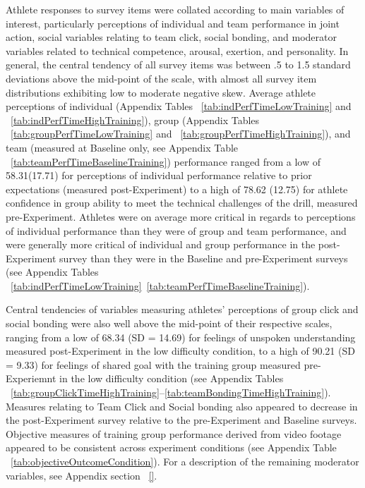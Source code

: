 \documentclass[english]{article}\usepackage[]{graphicx}\usepackage[]{color}
\begin{document}
Athlete responses to survey items were collated according to main variables of interest, particularly perceptions of individual and team performance in joint action, social variables relating to team click, social bonding, and moderator variables related to technical competence, arousal, exertion, and personality. In general, the central tendency of all survey items was between .5 to 1.5 standard deviations above the mid-point of the scale, with almost all survey item distributions exhibiting low to moderate negative skew.  Average athlete perceptions of individual (Appendix Tables ~\ref{tab:indPerfTimeLowTraining} and ~\ref{tab:indPerfTimeHighTraining}), group (Appendix Tables ~\ref{tab:groupPerfTimeLowTraining} and ~\ref{tab:groupPerfTimeHighTraining}), and team (measured at Baseline only, see Appendix Table ~\ref{tab:teamPerfTimeBaselineTraining}) performance ranged from a low of 58.31(17.71) for perceptions of individual performance relative to prior expectations (measured post-Experiment) to a high of 78.62 (12.75) for athlete confidence in group ability to meet the technical challenges of the drill, measured pre-Experiment.  Athletes were on average more critical in regards to perceptions of individual performance than they were of group and team performance, and were generally more critical of individual and group performance in the post-Experiment survey than they were in the Baseline and pre-Experiment surveys (see Appendix Tables ~\ref{tab:indPerfTimeLowTraining}\nobreakdash~\ref{tab:teamPerfTimeBaselineTraining}).

Central tendencies of variables measuring athletes' perceptions of group click and social bonding were also well above the mid-point of their respective scales, ranging from a low of 68.34 (SD = 14.69) for feelings of unspoken understanding measured post-Experiment in the low difficulty condition, to a high of 90.21 (SD = 9.33) for feelings of shared goal with the training group measured pre-Experiemnt in the low difficulty condition (see Appendix Tables ~\ref{tab:groupClickTimeHighTraining}\nobreakdash--\ref{tab:teamBondingTimeHighTraining}). Measures relating to Team Click and Social bonding also appeared to decrease in the post-Experiment survey relative to the pre-Experiment and Baseline surveys.  Objective measures of training group performance derived from video footage appeared to be consistent across experiment conditions (see Appendix Table ~\ref{tab:objectiveOutcomeCondition}).  For a description of the remaining moderator variables, see Appendix section ~\ref{}.
\end{document}

